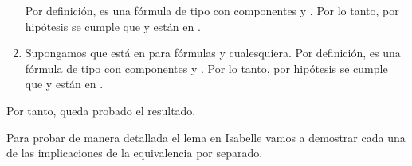 \begin{isabellebody}
\begin{isamarkuptext}
\begin{demostracion}
\begin{enumerate}
    Por definición,  es una fórmula de tipo \isa{{\isasymalpha}} con componentes  y . 
    Por lo tanto, por hipótesis se cumple que  y  están en .
    \item[\isa{{\isadigit{9}}{\isacharparenright}}] Supongamos que  está en  para fórmulas  y  cualesquiera. 
    Por definición,  es una fórmula de tipo \isa{{\isasymalpha}} con componentes  y .
    Por lo tanto, por hipótesis se cumple que  y  están en .
  \end{enumerate}

  Por tanto, queda probado el resultado.
\end{demostracion}

  Para probar de manera detallada el lema en Isabelle vamos a demostrar
  cada una de las implicaciones de la equivalencia por separado. 


\end{isamarkuptext}
\end{isabellebody}
